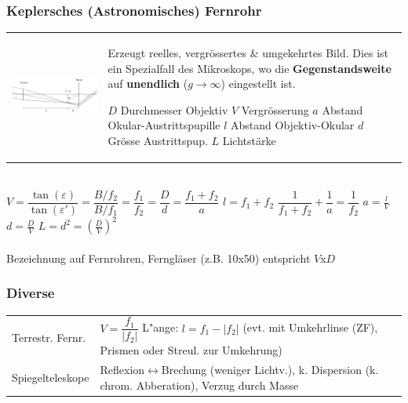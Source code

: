 \subsubsection{Keplersches (Astronomisches) Fernrohr  }
\begin{tabular}{ll}
  \parbox{10cm}{
    \includegraphics[width=10cm]{./bilder/astron.png}} &
  \parbox{8cm}{
    Erzeugt reelles, vergrössertes \& umgekehrtes Bild. Dies ist ein Spezialfall
    des Mikroskops, wo die \textbf{Gegenstandsweite} auf \textbf{unendlich} ($g \rightarrow \infty$) eingestellt ist. \\
    \\
    $D$ Durchmesser Objektiv \\
    $V$ Vergrösserung\\
    $a$ Abstand Okular-Austrittspupille\\
    $l$ Abstand Objektiv-Okular\\
    $d$ Grösse Austrittspup.\\
    $L$ Lichtstärke }
\end{tabular} \\
$V = \dfrac{\tan(\varepsilon)}{\tan(\varepsilon')} = \dfrac{B/f_2}{B/f_1} =
\dfrac{f_1}{f_2} = \dfrac{D}{d} = \dfrac{f_1+f_2}{a}$ \qquad $l = f_1+f_2$
\qquad $\dfrac{1}{f_1+f_2} + \dfrac{1}{a} = \dfrac{1}{f_2}$ \qquad
$a = \frac{l}{V} $ \qquad $d = \frac{D}{V}$ \qquad $L = d^2 = \left( \frac{D}{V}
\right)^2$\\ \\
Bezeichnung auf Fernrohren, Ferngläser (z.B. 10x50) entspricht $V$x$D$ \\

\subsubsection{Diverse  }
\begin{tabular}{ll}
  Terrestr. Fernr. & 
  $V=\dfrac{f_1}{|f_2|}$ \qquad L"ange: $l=f_1-|f_2|$ (evt. mit
  Umkehrlinse (ZF), Prismen oder Streul. zur Umkehrung) \\
  Spiegelteleskope &
  Reflexion$\leftrightarrow$Brechung (weniger Lichtv.), k. Dispersion (k. chrom.
 Abberation), Verzug durch Masse  \\
\end{tabular}

